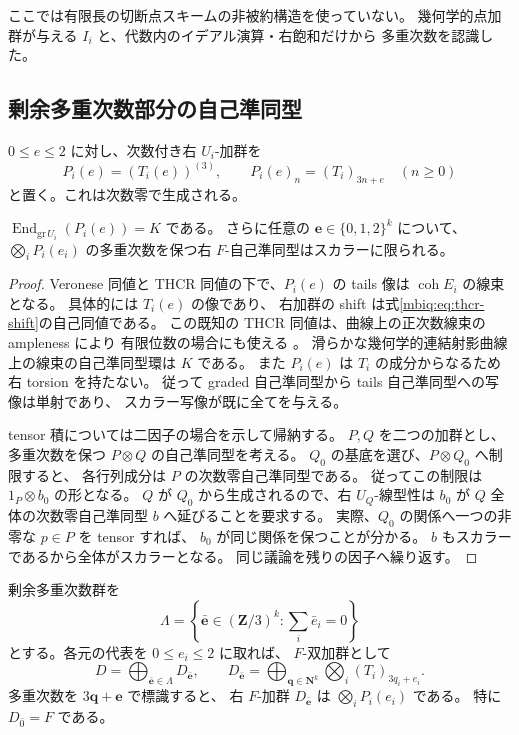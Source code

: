 ここでは有限長の切断点スキームの非被約構造を使っていない。
幾何学的点加群が与える $I_i$ と、代数内のイデアル演算・右飽和だけから
多重次数を認識した。

\subsection{剰余多重次数部分の自己準同型}

$0\le e\le2$ に対し、次数付き右 $U_i$-加群を
\[
 P_i(e)=(T_i(e))^{(3)},\qquad
 P_i(e)_n=(T_i)_{3n+e}\quad(n\ge0)
\]
と置く。これは次数零で生成される。

\begin{lemma}[剰余次数加群の次数零自己準同型]
\label{mbca:lem:residue-end}
$\operatorname{End}_{\mathrm{gr}\,U_i}(P_i(e))=K$ である。
さらに任意の $\boldsymbol e\in\{0,1,2\}^k$ について、
$\bigotimes_iP_i(e_i)$ の多重次数を保つ右 $F$-自己準同型はスカラーに限られる。
\end{lemma}
\begin{proof}
Veronese 同値と THCR 同値の下で、$P_i(e)$ の tails 像は
$\operatorname{coh}E_i$ の線束となる。
具体的には $T_i(e)$ の像であり、
右加群の shift は式\eqref{mbiq:eq:thcr-shift}の自己同値である。
この既知の THCR 同値は、曲線上の正次数線束の ampleness により
有限位数の場合にも使える
\cite[\S3, equations~(3.1), (3.3), Theorem~3.2]{NFMStaffordVdB}。
滑らかな幾何学的連結射影曲線上の線束の自己準同型環は $K$ である。
また $P_i(e)$ は $T_i$ の成分からなるため右 torsion を持たない。
従って graded 自己準同型から tails 自己準同型への写像は単射であり、
スカラー写像が既に全てを与える。

tensor 積については二因子の場合を示して帰納する。
$P,Q$ を二つの加群とし、多重次数を保つ $P\otimes Q$ の自己準同型を考える。
$Q_0$ の基底を選び、$P\otimes Q_0$ へ制限すると、
各行列成分は $P$ の次数零自己準同型である。
従ってこの制限は $1_P\otimes b_0$ の形となる。
$Q$ が $Q_0$ から生成されるので、右 $U_Q$-線型性は
$b_0$ が $Q$ 全体の次数零自己準同型 $b$ へ延びることを要求する。
実際、$Q_0$ の関係へ一つの非零な $p\in P$ を tensor すれば、
$b_0$ が同じ関係を保つことが分かる。
$b$ もスカラーであるから全体がスカラーとなる。
同じ議論を残りの因子へ繰り返す。
\end{proof}

剰余多重次数群を
\[
 \Lambda=\left\{\bar{\boldsymbol e}\in(\mathbf Z/3)^k:
                    \sum_i\bar e_i=0\right\}
\]
とする。各元の代表を $0\le e_i\le2$ に取れば、
$F$-双加群として
\[
 D=\bigoplus_{\bar{\boldsymbol e}\in\Lambda}D_{\bar{\boldsymbol e}},
 \qquad
 D_{\bar{\boldsymbol e}}=
 \bigoplus_{\boldsymbol q\in\mathbf N^k}
       \bigotimes_i(T_i)_{3q_i+e_i}.
\]
多重次数を $3\boldsymbol q+\boldsymbol e$ で標識すると、
右 $F$-加群 $D_{\bar{\boldsymbol e}}$ は $\bigotimes_iP_i(e_i)$ である。
特に $D_{\bar0}=F$ である。

